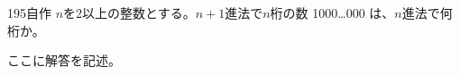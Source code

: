 \begin{thm}{195}{\maru}{自作}
 $n$を2以上の整数とする。$n+1$進法で$n$桁の数 1000\ldots000 は、$n$進法で何桁か。
\end{thm}

ここに解答を記述。
